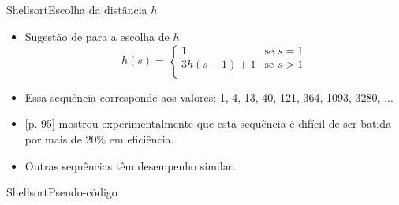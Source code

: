 \documentclass[aspectratio=169]{beamer}
\begin{document}
\begin{frame}{Shellsort}{Escolha da distância $h$}
\begin{itemize}
\item Sugestão de  para a escolha de $h$:
\begin{equation*}
    h(s) = \begin{cases}
               1               & \textrm{se } s = 1\\
               3 h(s-1) + 1  & \textrm{se } s > 1 \\
           \end{cases}
\end{equation*}
\item Essa sequência corresponde aos valores: 1, 4, 13, 40, 121, 364, 1093, 3280, ...
\item {}[p. 95] mostrou experimentalmente que esta sequência é difícil de ser batida por mais de 20\% em eficiência.
\item Outras sequências têm desempenho similar.
\end{itemize}
\end{frame}


\begin{frame}{Shellsort}{Pseudo-código}
\\
\end{frame}

\end{document}
